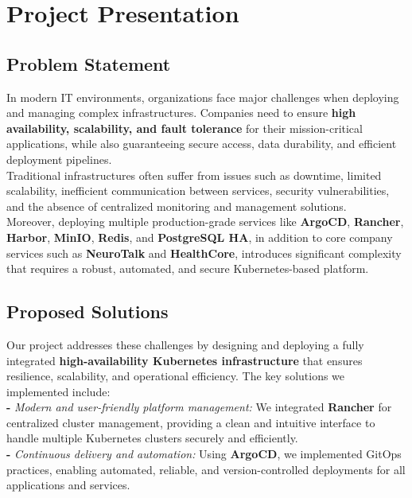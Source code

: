 \documentclass[a4paper,12pt]{report}
\begin{document}
\section{Project Presentation}
\begin{doublespace}

\subsection{Problem Statement}
\hspace{1cm}In modern IT environments, organizations face major challenges when deploying and managing complex infrastructures. 
Companies need to ensure \textbf{high availability, scalability, and fault tolerance} for their mission-critical applications, while also guaranteeing secure access, data durability, and efficient deployment pipelines. \\
Traditional infrastructures often suffer from issues such as downtime, limited scalability, inefficient communication between services, security vulnerabilities, and the absence of centralized monitoring and management solutions. \\
Moreover, deploying multiple production-grade services like \textbf{ArgoCD}, \textbf{Rancher}, \textbf{Harbor}, \textbf{MinIO}, \textbf{Redis}, and \textbf{PostgreSQL HA}, in addition to core company services such as \textbf{NeuroTalk} and \textbf{HealthCore}, introduces significant complexity that requires a robust, automated, and secure Kubernetes-based platform.

\subsection{Proposed Solutions}
\hspace{1cm}Our project addresses these challenges by designing and deploying a fully integrated \textbf{high-availability Kubernetes infrastructure} that ensures resilience, scalability, and operational efficiency. 
The key solutions we implemented include: \\

\textbf{-} \textit{Modern and user-friendly platform management:} We integrated \textbf{Rancher} for centralized cluster management, providing a clean and intuitive interface to handle multiple Kubernetes clusters securely and efficiently. \\

\textbf{-} \textit{Continuous delivery and automation:} Using \textbf{ArgoCD}, we implemented GitOps practices, enabling automated, reliable, and version-controlled deployments for all applications and services. \\


\end{doublespace}
\end{document}
